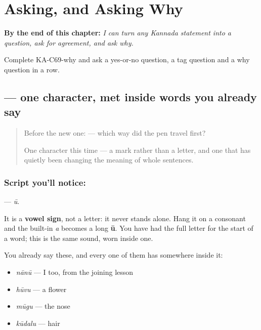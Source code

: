
\chapter{Asking, and Asking Why}
\label{ch:ka-asking-why}

\begin{chapteropening}
\textbf{By the end of this chapter:} \emph{I can turn any Kannada statement into a question, ask for agreement, and ask why.}

Complete KA-C69-why and ask a yes-or-no question, a tag question and a why question in a row.
\end{chapteropening}

\section[\texorpdfstring{\kn{ೂ} (ū)}{ೂ (ū)}]{ — one character, met inside words you already say}

\label{lesson:KA-S136-vowel-sign-uu}



\begin{quote}
Before the new one:  — which way did the pen travel first?

One character this time — a mark rather than a letter, and one that has quietly been changing the meaning of whole sentences.
\end{quote}

\subsection*{Script you'll notice: }
\textbf{} — \emph{ū}.

It is a \textbf{vowel sign}, not a letter: it never stands alone. Hang it on a consonant and the built-in \emph{a} becomes a long \textbf{ū}. You have had the full letter  for the start of a word; this is the same sound, worn inside one.

You already say these, and every one of them has  somewhere inside it:

\begin{itemize}
\raggedright
  \item \textbf{} \emph{nānū} — I too, from the joining lesson
  \item \textbf{} \emph{hūvu} — a flower
  \item \textbf{} \emph{mūgu} — the nose
  \item \textbf{} \emph{kūdalu} — hair
\end{itemize}

